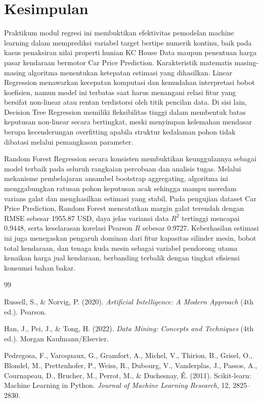 \documentclass[a4paper,oneside,12pt]{report}
\begin{document}
\chapter{Kesimpulan}

Praktikum modul regresi ini membuktikan efektivitas pemodelan machine learning dalam memprediksi variabel target bertipe numerik kontinu, baik pada kasus penaksiran nilai properti hunian KC House Data maupun penentuan harga pasar kendaraan bermotor Car Price Prediction. Karakteristik matematis masing-masing algoritma menentukan ketepatan estimasi yang dihasilkan. Linear Regression menawarkan kecepatan komputasi dan kemudahan interpretasi bobot koefisien, namun model ini terbatas saat harus menangani relasi fitur yang bersifat non-linear atau rentan terdistorsi oleh titik pencilan data. Di sisi lain, Decision Tree Regression memiliki fleksibilitas tinggi dalam membentuk batas keputusan non-linear secara bertingkat, meski menyimpan kelemahan mendasar berupa kecenderungan overfitting apabila struktur kedalaman pohon tidak dibatasi melalui pemangkasan parameter.

Random Forest Regression secara konsisten membuktikan keunggulannya sebagai model terbaik pada seluruh rangkaian percobaan dan analisis tugas. Melalui mekanisme pembelajaran ansambel bootstrap aggregating, algoritma ini menggabungkan ratusan pohon keputusan acak sehingga mampu meredam varians galat dan menghasilkan estimasi yang stabil. Pada pengujian dataset Car Price Prediction, Random Forest mencatatkan margin galat terendah dengan RMSE sebesar 1955.87 USD, daya jelas variansi data $R^2$ tertinggi mencapai 0.9448, serta keselarasan korelasi Pearson $R$ sebesar 0.9727. Keberhasilan estimasi ini juga menegaskan pengaruh dominan dari fitur kapasitas silinder mesin, bobot total kendaraan, dan tenaga kuda mesin sebagai variabel pendorong utama kenaikan harga jual kendaraan, berbanding terbalik dengan tingkat efisiensi konsumsi bahan bakar.
\clearpage

\begin{thebibliography}{99}

Russell, S., \& Norvig, P. (2020). \textit{Artificial Intelligence: A Modern Approach} (4th ed.). Pearson.

Han, J., Pei, J., \& Tong, H. (2022). \textit{Data Mining: Concepts and Techniques} (4th ed.). Morgan Kaufmann/Elsevier.

Pedregosa, F., Varoquaux, G., Gramfort, A., Michel, V., Thirion, B., Grisel, O., Blondel, M., Prettenhofer, P., Weiss, R., Dubourg, V., Vanderplas, J., Passos, A., Cournapeau, D., Brucher, M., Perrot, M., \& Duchesnay, \'E. (2011). Scikit-learn: Machine Learning in Python. \textit{Journal of Machine Learning Research}, 12, 2825--2830.

\end{thebibliography}
\end{document}
